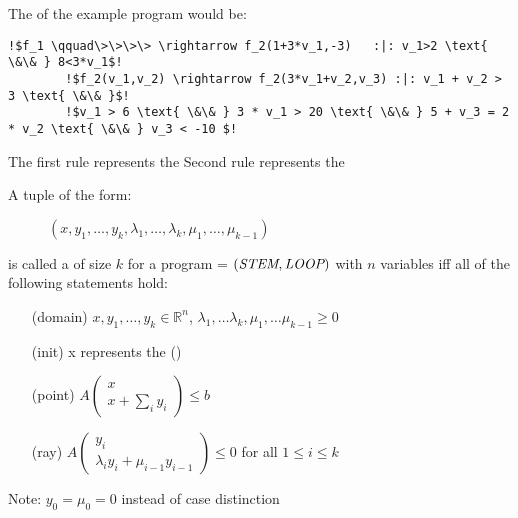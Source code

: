 \begin{frame}[fragile]
	\begin{example}
		The \its of the example program would be: \newline
		\begin{lstlisting}[linewidth=10.5cm, escapechar = !]
		!$f_1 \qquad\>\>\>\> \rightarrow f_2(1+3*v_1,-3)   :|: v_1>2 \text{ \&\& } 8<3*v_1$!
		!$f_2(v_1,v_2) \rightarrow f_2(3*v_1+v_2,v_3) :|: v_1 + v_2 > 3 \text{ \&\& }$! 
		!$v_1 > 6 \text{ \&\& } 3 * v_1 > 20 \text{ \&\& } 5 + v_3 = 2 * v_2 \text{ \&\& } v_3 < -10 $!
		\end{lstlisting}
		The first rule represents the \stem \newline
		Second rule represents the \loopt
	\end{example}	
\end{frame}

\begin{frame}
	\begin{definition}
		\label{def:gna}
		A tuple of the form:
		\vspace{-1em}
		\begin{figure}
			\centering
			$(x, y_1, \dots, y_k, \lambda_1, \dots, \lambda_k, \mu_1, \dots, \mu_{k-1})$
		\end{figure}  
		\vspace{-1em}
		is called a \gna of size $k$ for a program = $(\textit{STEM}, \textit{LOOP})$ with $n$ variables iff all of the following statements hold:
		\begin{itemize}
			\setlength{\itemindent}{1in}
			\item[(domain)] $x, y_1, \dots, y_k \in \mathbb{R}^n$, $\lambda_1, \dots \lambda_k, \mu_1, \dots \mu_{k-1} \ge 0$
			\item[(init)] x represents the \startterm (\stem)
			\item[(point)] $A\begin{pmatrix} x \\ x + \sum_i y_i \end{pmatrix} \le b$
			\item[(ray)] $A\begin{pmatrix} y_i \\ \lambda_i y_i + \mu_{i-1} y_{i-1} \end{pmatrix} \le 0$ for all $1 \le i \le k$
		\end{itemize}
		Note: $y_0 = \mu_0 = 0$ instead of case distinction
	\end{definition}
\end{frame}


